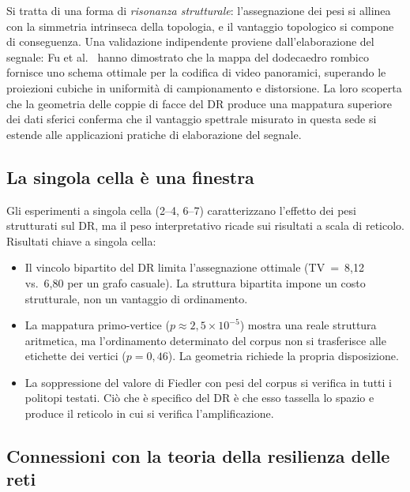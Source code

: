 \documentclass[11pt]{article}
\begin{document}
Si tratta di una forma di \emph{risonanza strutturale}: l'assegnazione
dei pesi si allinea con la simmetria intrinseca della topologia, e il
vantaggio topologico si compone di conseguenza. Una validazione
indipendente proviene dall'elaborazione del segnale: Fu
et al.~\cite{fu2009rhombic} hanno dimostrato che la mappa del
dodecaedro rombico fornisce uno schema ottimale per la codifica di
video panoramici, superando le proiezioni cubiche in uniformit\`a di
campionamento e distorsione. La loro scoperta che la geometria delle
coppie di facce del DR produce una mappatura superiore dei dati
sferici conferma che il vantaggio spettrale misurato in questa sede
si estende alle applicazioni pratiche di elaborazione del segnale.

\subsection{La singola cella \`e una finestra}

Gli esperimenti a singola cella (2--4, 6--7) caratterizzano l'effetto
dei pesi strutturati sul DR, ma il peso interpretativo ricade sui
risultati a scala di reticolo. Risultati chiave a singola cella:

\begin{itemize}
  \item Il vincolo bipartito del DR limita l'assegnazione ottimale
    (TV~=~8,12 vs.\ 6,80 per un grafo casuale). La struttura bipartita
    impone un costo strutturale, non un vantaggio di ordinamento.
  \item La mappatura primo-vertice ($p \approx 2{,}5 \times 10^{-5}$)
    mostra una reale struttura aritmetica, ma l'ordinamento determinato
    del corpus non si trasferisce alle etichette dei vertici
    ($p = 0{,}46$). La geometria richiede la propria disposizione.
  \item La soppressione del valore di Fiedler con pesi del corpus si
    verifica in tutti i politopi testati. Ci\`o che \`e specifico del
    DR \`e che esso tassella lo spazio e produce il reticolo in cui si
    verifica l'amplificazione.
\end{itemize}

\subsection{Connessioni con la teoria della resilienza delle reti}
\label{sec:resilience}
\end{document}
